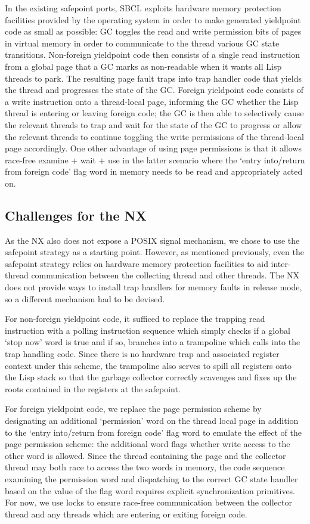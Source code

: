 \documentclass[format=sigconf]{acmart}
\begin{document}
In the existing safepoint ports, SBCL exploits hardware memory protection facilities provided by the operating system in order to make generated yieldpoint code as small as possible: GC toggles the read and write permission bits of pages in virtual memory in order to communicate to the thread various GC state transitions. Non-foreign yieldpoint code then consists of a single read instruction from a global page that a GC marks as non-readable when it wants all Lisp threads to park. The resulting page fault traps into trap handler code that yields the thread and progresses the state of the GC. Foreign yieldpoint code consists of a write instruction onto a thread-local page, informing the GC whether the Lisp thread is entering or leaving foreign code; the GC is then able to selectively cause the relevant threads to trap and wait for the state of the GC to progress or allow the relevant threads to continue toggling the write permissions of the thread-local page accordingly. One other advantage of using page permissions is that it allows race-free examine + wait + use in the latter scenario where the `entry into/return from foreign code' flag word in memory needs to be read and appropriately acted on.

\subsection{Challenges for the NX}
As the NX also does not expose a POSIX signal mechanism, we chose to use the safepoint strategy as a starting point. However, as mentioned previously, even the safepoint strategy relies on hardware memory protection facilities to aid inter-thread communication between the collecting thread and other threads. The NX does not provide ways to install trap handlers for memory faults in release mode, so a different mechanism had to be devised.

For non-foreign yieldpoint code, it sufficed to replace the trapping read instruction with a polling instruction sequence which simply checks if a global `stop now' word is true and if so, branches into a trampoline which calls into the trap handling code. Since there is no hardware trap and associated register context under this scheme, the trampoline also serves to spill all registers onto the Lisp stack so that the garbage collector correctly scavenges and fixes up the roots contained in the registers at the safepoint.

For foreign yieldpoint code, we replace the page permission scheme by designating an additional `permission' word on the thread local page in addition to the `entry into/return from foreign code' flag word to emulate the effect of the page permission scheme: the additional word flags whether write access to the other word is allowed. Since the thread containing the page and the collector thread may both race to access the two words in memory, the code sequence examining the permission word and dispatching to the correct GC state handler based on the value of the flag word requires explicit synchronization primitives. For now, we use locks to ensure race-free communication between the collector thread and any threads which are entering or exiting foreign code.
\end{document}
